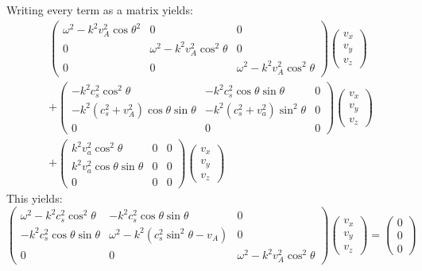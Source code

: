 \documentclass[a4paper]{article}
\numberwithin{figure}{section}
\numberwithin{equation}{section}
\begin{document}
Writing every term as a matrix yields:
\begin{align*}
	&\begin{pmatrix}
		\omega^2  - k^2 v_A^2 \cos\theta^2    & 0 & 0 \\
		0 & \omega^2 - k^2v_A^2\cos^2\theta & 0 \\
		0 & 0 & \omega^2 - k^2v_A^2\cos^2\theta
	\end{pmatrix} 
	\begin{pmatrix} v_x \\ v_y \\ v_z \end{pmatrix} \\
	 & + \begin{pmatrix} 
		 -k^2 c_s^2 \cos^2 \theta & - k^2 c_s^2 \cos\theta \sin \theta  & 0 \\
		 -k^2(c_s^2 + v_A^2) \cos\theta \sin \theta & -k^2(c_s^2 + v_a^2) \sin^2\theta & 0 \\
		 0 & 0 & 0
	 \end{pmatrix} \begin{pmatrix} v_x \\ v_y \\ v_z \end{pmatrix} \\  
	 &  + \begin{pmatrix} 
		 k^2 v_a^2 \cos^2\theta & 0 & 0  \\
		 k^2 v_a^2 \cos \theta \sin \theta & 0 & 0 \\
		 0 & 0 & 0
	 \end{pmatrix} \begin{pmatrix} v_x \\ v_y \\ v_z \end{pmatrix} 
\end{align*}
This yields:
\begin{equation}\label{eq:MHD_linear_matrix}
	\begin{pmatrix}
		\omega^2  - k^2 c_s^2 \cos^2\theta   & -k^2c_s^2\cos\theta \sin \theta & 0 \\
		-k^2 c_s^2 \cos\theta \sin \theta & \omega^2 - k^2(c_s^2\sin^2\theta - v_A)   & 0 \\
		0 & 0 & \omega^2 - k^2v_A^2\cos^2\theta
	\end{pmatrix} 
	\begin{pmatrix} v_x \\ v_y \\ v_z \end{pmatrix} 
	 = \begin{pmatrix} 0 \\ 0 \\0  \end{pmatrix} 
\end{equation}
\end{document}
